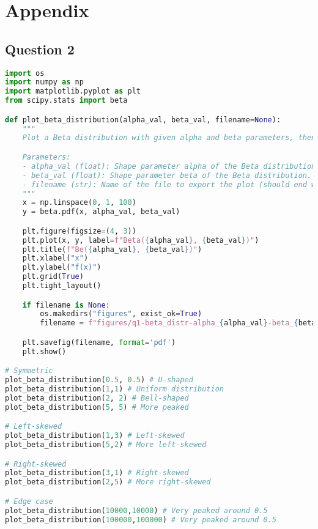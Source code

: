 \section{Appendix} \label{appendix}


\subsection{Question 2}

\begin{lstlisting}[language=Python]
import os
import numpy as np
import matplotlib.pyplot as plt
from scipy.stats import beta

def plot_beta_distribution(alpha_val, beta_val, filename=None):
    """
    Plot a Beta distribution with given alpha and beta parameters, then save as a PDF.

    Parameters:
    - alpha_val (float): Shape parameter alpha of the Beta distribution.
    - beta_val (float): Shape parameter beta of the Beta distribution.
    - filename (str): Name of the file to export the plot (should end with .pdf).
    """
    x = np.linspace(0, 1, 100)
    y = beta.pdf(x, alpha_val, beta_val)

    plt.figure(figsize=(4, 3))
    plt.plot(x, y, label=f"Beta({alpha_val}, {beta_val})")
    plt.title(f"Be({alpha_val}, {beta_val})")
    plt.xlabel("x")
    plt.ylabel("f(x)")
    plt.grid(True)
    plt.tight_layout()

    if filename is None:
        os.makedirs("figures", exist_ok=True)
        filename = f"figures/q1-beta_distr-alpha_{alpha_val}-beta_{beta_val}.pdf"

    plt.savefig(filename, format='pdf')
    plt.show()

# Symmetric
plot_beta_distribution(0.5, 0.5) # U-shaped
plot_beta_distribution(1,1) # Uniform distribution
plot_beta_distribution(2, 2) # Bell-shaped
plot_beta_distribution(5, 5) # More peaked

# Left-skewed
plot_beta_distribution(1,3) # Left-skewed
plot_beta_distribution(5,2) # More left-skewed

# Right-skewed
plot_beta_distribution(3,1) # Right-skewed
plot_beta_distribution(2,5) # More right-skewed

# Edge case
plot_beta_distribution(10000,10000) # Very peaked around 0.5
plot_beta_distribution(100000,100000) # Very peaked around 0.5
\end{lstlisting}


